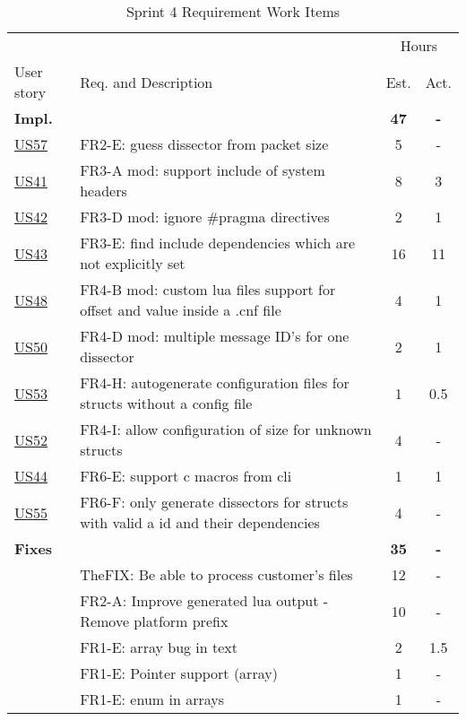 \begin{table}[!htb] \small \center
\caption{Sprint 4 Requirement Work Items \label{tab:sprint4req}}
\begin{tabularx}{\textwidth}{l X c c}
	\toprule
	& & \multicolumn{2}{c}{Hours} \\
	\cmidrule(r){3-4}
	User story & Req. and Description & Est. & Act. \\
	\midrule
	\textbf{Impl.} &  & \textbf{47} & \textbf{-} \\
	\hyperref[tab:req:stories13]{US57} & FR2-E: guess \gls{dissector} from \gls{packet} size & 5 & - \\
 	\hyperref[tab:req:stories10]{US41} & FR3-A mod: support \gls{include} of system \glspl{header} &  8  & 3 \\
	\hyperref[tab:req:stories10]{US42} & FR3-D mod: ignore \#pragma directives & 2 & 1 \\
	\hyperref[tab:req:stories10]{US43} & FR3-E: find include dependencies which are not explicitly set & 16  & 11 \\
	\hyperref[tab:req:stories11]{US48} & FR4-B mod: custom \Gls{lua} files support for offset and value inside a .cnf file & 4 & 1 \\
	\hyperref[tab:req:stories12]{US50} & FR4-D mod: multiple message ID's for one \gls{dissector} & 2 & 1 \\
	\hyperref[tab:req:stories12]{US53} & FR4-H: autogenerate configuration files for \glspl{struct} without a config file & 1  & 0.5\\
	\hyperref[tab:req:stories12]{US52} & FR4-I: allow configuration of size for unknown \glspl{struct} & 4 & - \\
	\hyperref[tab:req:stories10]{US44} & FR6-E: support \Gls{c} macros from \gls{cli} & 1 & 1 \\
	\hyperref[tab:req:stories12]{US55} & FR6-F: only generate \glspl{dissector} for \glspl{struct} with valid a id and their dependencies & 4 & - \\
	\addlinespace
	\textbf{Fixes} &  & \textbf{35} & \textbf{-} \\
	& TheFIX: Be able to process customer's files & 12 & - \\
	 & FR2-A: Improve generated \Gls{lua} output - Remove platform prefix & 10 & - \\
	 & FR1-E: \Gls{array} bug in text & 2 & 1.5 \\
	 & FR1-E: Pointer support (array) & 1 & - \\
	 & FR1-E: \Gls{enum} in \glspl{array} & 1 & - \\		

\end{tabularx}
\end{table}
